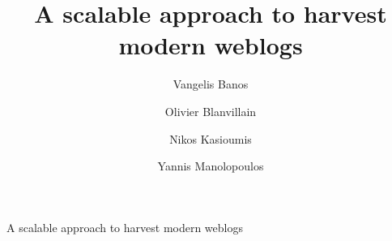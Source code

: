 ﻿\documentclass{ws-ijait}
\begin{document}
{A scalable approach to harvest modern weblogs}

\catchline{}{}{}{}{}

\title{A scalable approach to harvest modern weblogs}

\author{\footnotesize Vangelis Banos}

\address{Department of Informatics, Aristotle University of Thessaloniki (AUTH),\\
Thessaloniki, 54124, Greece.\\
}

\author{\footnotesize Olivier Blanvillain}

\address{École Polytechnique Fédérale de Lausanne (EPFL),\\
1015 Lausanne, Switzerland.\\
}

\author{\footnotesize Nikos Kasioumis}

\address{European Organization for Nuclear Research (CERN),\\
Geneva 23, 1211, Switzerland.\\
}

\author{\footnotesize Yannis Manolopoulos}

\address{Department of Informatics, Aristotle University of Thessaloniki (AUTH),\\
Thessaloniki, 54124, Greece.\\
}

\maketitle

\begin{history}
\end{history}

\begin{abstract}
    
\end{abstract}














\end{document}
